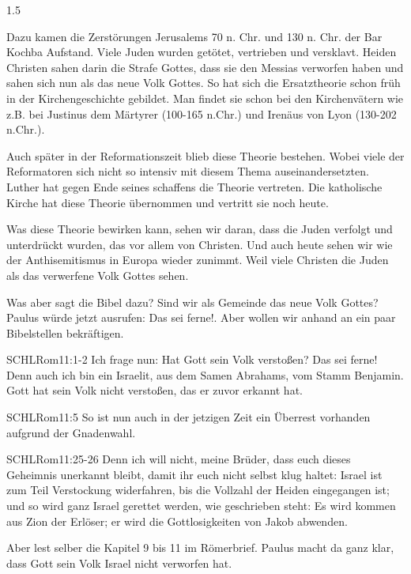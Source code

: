 \documentclass[fontsize=14pt]{../../inc/mybib}
\begin{document}
\begin{spacing}{1.5}
\begin{block}
        Dazu kamen die Zerstörungen Jerusalems 70 n. Chr. und 130 n. Chr. der Bar Kochba Aufstand. Viele Juden wurden getötet, vertrieben und versklavt. Heiden Christen sahen darin die Strafe Gottes, dass sie den Messias verworfen haben und sahen sich nun als das neue Volk Gottes. So hat sich die Ersatztheorie schon früh in der Kirchengeschichte gebildet. Man findet sie schon bei den Kirchenvätern wie z.B. bei Justinus dem Märtyrer (100-165 n.Chr.) und Irenäus von Lyon (130-202 n.Chr.).

        Auch später in der Reformationszeit blieb diese Theorie bestehen. Wobei viele der Reformatoren sich nicht so intensiv mit diesem Thema auseinandersetzten. Luther hat gegen Ende seines schaffens die Theorie vertreten. Die katholische Kirche hat diese Theorie übernommen und vertritt sie noch heute.

        Was diese Theorie bewirken kann, sehen wir daran, dass die Juden verfolgt und unterdrückt wurden, das vor allem von Christen. Und auch heute sehen wir wie der Anthisemitismus in Europa wieder zunimmt. Weil viele Christen die Juden als das verwerfene Volk Gottes sehen.

        Was aber sagt die Bibel dazu? Sind wir als Gemeinde das neue Volk Gottes? Paulus würde jetzt ausrufen: Das sei ferne!.
        Aber wollen wir anhand an ein paar Bibelstellen bekräftigen.
        \begin{bibelbox}{SCHL}{Rom}{11:1-2}
        Ich frage nun: Hat Gott sein Volk verstoßen? Das sei ferne! Denn auch ich bin ein Israelit, aus dem Samen Abrahams, vom Stamm Benjamin. Gott hat sein Volk nicht verstoßen, das er zuvor erkannt hat. 
        \end{bibelbox}
        \begin{bibelbox}{SCHL}{Rom}{11:5}
            So ist nun auch in der jetzigen Zeit ein Überrest vorhanden aufgrund der Gnadenwahl.
        \end{bibelbox}
        \begin{bibelbox}{SCHL}{Rom}{11:25-26}
            Denn ich will nicht, meine Brüder, dass euch dieses Geheimnis unerkannt bleibt, damit ihr euch nicht selbst klug haltet: Israel ist zum Teil Verstockung widerfahren, bis die Vollzahl der Heiden eingegangen ist; und so wird ganz Israel gerettet werden, wie geschrieben steht: Es wird kommen aus Zion der Erlöser; er wird die Gottlosigkeiten von Jakob abwenden.
        \end{bibelbox}
        Aber lest selber die Kapitel 9 bis 11 im Römerbrief. Paulus macht da ganz klar, dass Gott sein Volk Israel nicht verworfen hat. 


\end{block}
\end{spacing}
\end{document}
